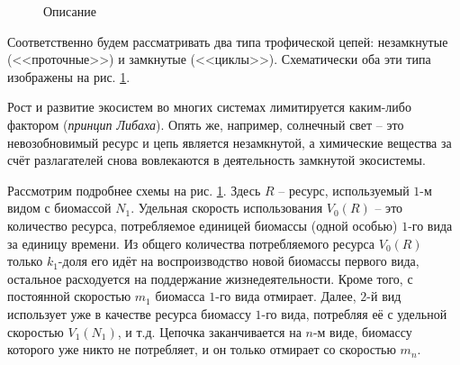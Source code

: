 \begin{figure}[H]
    \caption{Описание} \label{shemas}
    \end{figure}

    Соответственно будем рассматривать два типа трофической цепей: незамкнутые (<<проточные>>) и замкнутые (<<циклы>>). Схематически оба эти типа изображены на рис. \ref{shemas}.

    Рост и развитие экосистем во многих системах лимитируется каким-либо фактором (\textit{принцип Либаха}). Опять же, например, солнечный свет -- это невозобновимый ресурс и цепь является незамкнутой, а химические вещества за счёт разлагателей снова вовлекаются в деятельность замкнутой экосистемы.

    Рассмотрим подробнее схемы на рис. \ref{shemas}. Здесь \(R\) -- ресурс, используемый \(1\)-м видом с биомассой \(N_1\). Удельная скорость использования \(V_0(R)\) -- это количество ресурса, потребляемое единицей биомассы (одной особью) \(1\)-го вида за единицу времени. Из общего количества потребляемого ресурса \(V_0(R)\) только \(k_1\)-доля его идёт на воспроизводство новой биомассы первого вида, остальное расходуется на поддержание жизнедеятельности. Кроме того, с постоянной скоростью \(m_1\) биомасса \(1\)-го вида отмирает. Далее, \(2\)-й вид использует уже в качестве ресурса биомассу \(1\)-го вида, потребляя её с удельной скоростью \(V_1(N_1)\), и т.д. Цепочка заканчивается на \(n\)-м виде, биомассу которого уже никто не потребляет, и он только отмирает со скоростью \(m_n\).

